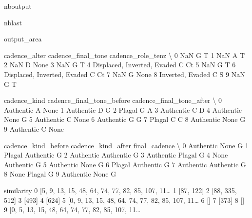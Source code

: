 \documentclass[letterpaper,10pt,english]{sphinxmanual}
\begin{document}
\begin{sphinxuseclass}{nboutput}
\begin{sphinxuseclass}{nblast}
{\begin{sphinxuseclass}{output_area}
\begin{sphinxuseclass}{}
\begin{sphinxVerbatim}[commandchars=\\\{\}]
                 cadence\_alter cadence\_final\_tone cadence\_role\_tenz  \textbackslash{}
0                          NaN                  G                 T
1                          NaN                  A                 T
2                          NaN                  D              None
3                          NaN                  G                 T
4  Displaced, Inverted, Evaded                  C                Ct
5                          NaN                  G                 T
6  Displaced, Inverted, Evaded                  C                Ct
7                          NaN                  G              None
8             Inverted, Evaded                  C                 S
9                          NaN                  G                 T

  cadence\_kind cadence\_final\_tone\_before cadence\_final\_tone\_after  \textbackslash{}
0    Authentic                         A                     None
1    Authentic                         D                        G
2       Plagal                         G                        A
3    Authentic                         C                        D
4    Authentic                      None                        G
5    Authentic                         C                     None
6    Authentic                         G                        G
7       Plagal                         C                        C
8    Authentic                      None                        G
9    Authentic                         C                     None

  cadence\_kind\_before cadence\_kind\_after final\_cadence  \textbackslash{}
0           Authentic               None             G
1              Plagal          Authentic             G
2           Authentic          Authentic             G
3           Authentic             Plagal             G
4                None          Authentic             G
5           Authentic               None             G
6              Plagal          Authentic             G
7           Authentic          Authentic             G
8                None             Plagal             G
9           Authentic               None             G

                                          similarity
0  [5, 9, 13, 15, 48, 64, 74, 77, 82, 85, 107, 11{\ldots}
1                                          [87, 122]
2                                     [88, 335, 512]
3                                              [493]
4                                              [624]
5  [0, 9, 13, 15, 48, 64, 74, 77, 82, 85, 107, 11{\ldots}
6                                                 []
7                                              [373]
8                                                 []
9  [0, 5, 13, 15, 48, 64, 74, 77, 82, 85, 107, 11{\ldots}
\end{sphinxVerbatim}




\end{sphinxuseclass}
\end{sphinxuseclass}}
\end{sphinxuseclass}
\end{sphinxuseclass}
\end{document}
